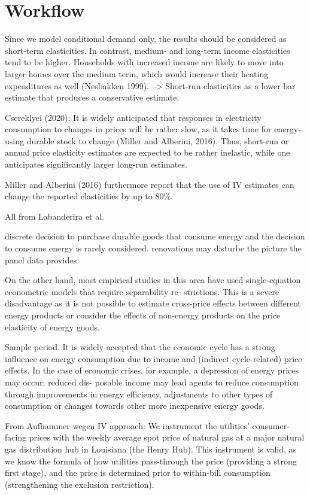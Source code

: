 \documentclass[12pt,twoside]{reedthesis}
\begin{document}
\hypertarget{workflow}{%
\section{Workflow}\label{workflow}}

Since we model conditional demand only, the results should be considered as short-term elasticities. In contrast, medium- and long-term income elasticities tend to be higher. Households with increased income are likely to move into larger homes over the medium term, which would increase their heating expenditures as well (Nesbakken 1999). --\textgreater{} Short-run elasticities as a lower bar estimate that produces a conservative estimate.

Csereklyei (2020):
It is widely anticipated that responses in electricity consumption to changes in prices will be rather slow, as it takes time for energy-using durable stock to change (Miller and Alberini, 2016). Thus, short-run or annual price elasticity estimates are expected to be rather inelastic, while one anticipates significantly larger long-run estimates.

Miller and Alberini (2016) furthermore report that the use of IV estimates can change the reported elasticities by up to 80\%.

All from Labanderira et al.

discrete decision to purchase durable goods that consume energy and the decision to consume energy is rarely considered.
renovations may disturbe the picture the panel data provides

On the other hand, most empirical studies in this area have used single-equation econometric models that require separability re- strictions. This is a severe disadvantage as it is not possible to estimate cross-price effects between different energy products or consider the effects of non-energy products on the price elasticity of energy goods.

Sample period. It is widely accepted that the economic cycle has a strong influence on energy consumption due to income and (indirect cycle-related) price effects. In the case of economic crises, for example, a depression of energy prices may occur; reduced dis- posable income may lead agents to reduce consumption through improvements in energy efficiency, adjustments to other types of consumption or changes towards other more inexpensive energy goods.

From Aufhammer wegen IV approach:
We instrument the utilities' consumer-facing prices with the weekly average spot price of natural gas at a major natural gas distribution hub in Louisiana (the Henry Hub). This instrument is valid, as we know the formula of how utilities pass-through the price (providing a strong first stage), and the price is determined prior to within-bill consumption (strengthening the exclusion restriction).
\end{document}
